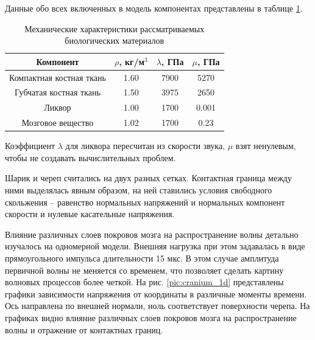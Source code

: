 Данные обо всех включенных в модель компонентах представлены в таблице \ref{tbl:cranium_elastic_parameters}.

\begin{table}[h]
\centering
\caption{Механические характеристики рассматриваемых биологических материалов}
\begin{tabular}{|c|c|c|c|}
\hline
Компонент & $\rho$, кг/м$^{3}$ & $\lambda$, ГПа & $\mu$, ГПа  \\
\hline
Компактная костная ткань & 1.60 & 7900 & 5270 \\
Губчатая костная ткань & 1.50 & 3975 & 2650 \\
Ликвор & 1.00 & 1700 & 0.001 \\
Мозговое вещество & 1.02 & 1700 & 0.23 \\
\hline
\end{tabular}
\label{tbl:cranium_elastic_parameters}
\end{table}

Коэффициент $\lambda$ для ликвора пересчитан из скорости звука, $\mu$ взят ненулевым, чтобы не создавать вычислительных проблем.

Шарик и череп считались на двух разных сетках. Контактная граница между ними выделялась явным образом, на ней ставились условия свободного скольжения – равенство нормальных напряжений и нормальных компонент скорости и нулевые касательные напряжения.


Влияние различных слоев покровов мозга на распространение волны детально изучалось на одномерной модели. Внешняя нагрузка при этом задавалась в виде прямоугольного импульса длительности 15 мкс. В этом случае амплитуда первичной волны не меняется со временем, что позволяет сделать картину волновых процессов более четкой. На рис. \ref{pic:cranium_1d} представлены графики зависимости напряжения от координаты в различные моменты времени. Ось направлена по внешней нормали, ноль соответствует поверхности черепа. На графиках видно влияние различных слоев покровов мозга на распространение волны и отражение от контактных границ.

